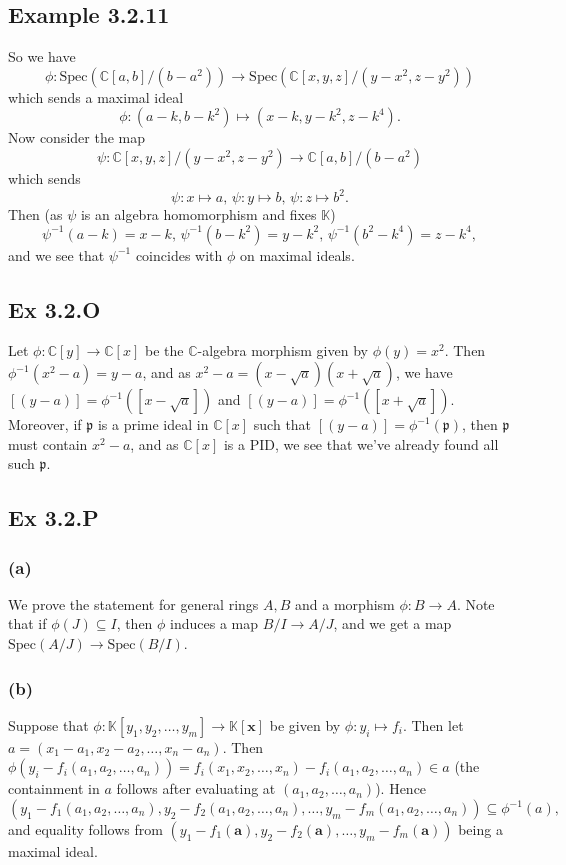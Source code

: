 \documentclass{article}
\theoremstyle{definition}
\newcommand{\C}{\mathbb{C}}
\newcommand{\K}{\mathbb{K}}
\newcommand{\Kx}{\K[\bm{x}]}
\newcommand{\Spec}{\text{Spec}}
\newcommand{\spec}{\Spec}
\begin{document}
\subsection*{Example 3.2.11}
So we have
\[
	\phi : \Spec(\C[a, b]/(b-a^2)) \to \Spec(\C[x,y,z]/(y-x^2, z-y^2))
\]
which sends a maximal ideal
\[
	\phi
	:
	(a - k, b - k^2)
	\mapsto
	(x - k, y - k^2, z - k^4).
\]
Now consider the map
\[
	\psi :
	\C[x,y,z]/(y-x^2, z-y^2)
	\to
	\C[a, b]/(b-a^2)
\]
which sends
\[
	\psi : x \mapsto a, \,
	\psi : y \mapsto b, \,
	\psi : z \mapsto b^2.
\]
Then (as $\psi$ is an algebra homomorphism and fixes $\K$)
\[
	\psi^{-1}(a - k) = x - k, \,
	\psi^{-1}(b - k^2) = y - k^2, \,
	\psi^{-1}(b^2 - k^4) = z - k^4,
\]
and we see that $\psi^{-1}$ coincides with $\phi$ on maximal ideals.

\subsection*{Ex 3.2.O}

Let $\phi : \C[y] \to \C[x]$ be the $\C$-algebra morphism given by $\phi(y) =
	x^2$. Then $\phi^{-1}(x^2 - a) = y - a$, and as $x^2 - a = (x - \sqrt{a})(x +
	\sqrt{a})$, we have $[(y - a)] = \phi^{-1}([x - \sqrt{a}])$ and $[(y - a)] =
	\phi^{-1}([x + \sqrt{a}])$. Moreover, if $\mathfrak{p}$ is a prime ideal in
$\C[x]$ such that $[(y - a)] = \phi^{-1}(\mathfrak{p})$, then $\mathfrak{p}$
must contain $x^2 - a$, and as $\C[x]$ is a PID, we see that we've already
found all such $\mathfrak{p}$.

\subsection*{Ex 3.2.P}

\subsubsection*{(a)}

We prove the statement for general rings $A, B$ and a morphism $\phi : B \to
	A$. Note that if $\phi(J) \subseteq I$, then $\phi$ induces a map $B/I \to
	A/J$, and we get a map $\spec(A/J) \to \spec(B/I)$.

\subsubsection*{(b)}

Suppose that $\phi : \K[y_1, y_2, \ldots, y_m] \to \Kx$ be given by $\phi : y_i
	\mapsto f_i$. Then let $a = (x_1 - a_1, x_2 - a_2, \ldots, x_n - a_n)$. Then
$\phi(y_i - f_i(a_1, a_2, \ldots, a_n)) = f_i(x_1, x_2, \ldots, x_n) - f_i(a_1,
	a_2, \ldots, a_n) \in a$ (the containment in $a$ follows after evaluating at
$(a_1, a_2, \ldots, a_n)$). Hence
\[
	(y_1 - f_1(a_1, a_2, \ldots, a_n), y_2 - f_2(a_1, a_2, \ldots, a_n), \ldots, y_m - f_m(a_1, a_2, \ldots, a_n))
	\subseteq
	\phi^{-1}(a),
\]
and equality follows from $(y_1 - f_1(\bm{a}), y_2 - f_2(\bm{a}), \ldots, y_m -
	f_m(\bm{a}))$ being a maximal ideal.
\end{document}
